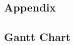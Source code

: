 \documentclass[onecolumn, draftclsnofoot, 10pt, compsoc]{IEEEtran}
\begin{document}
\begin{landscape}
\section{Appendix}
\subsection{Gantt Chart}
\thispagestyle{empty}
\vspace*{\fill}
\noindent
\hspace*{-\oddsidemargin}%
\vspace*{\fill}
\vfill
\raisebox{-10pt}{\makebox[\linewidth]{\thepage}}
\end{landscape}
\end{document}
